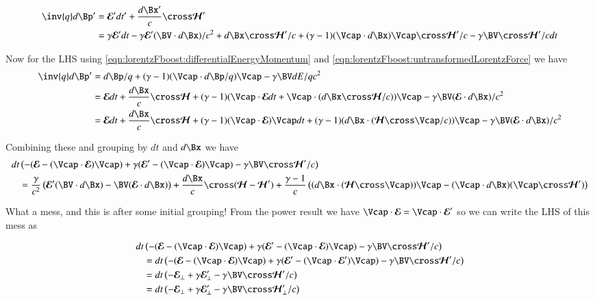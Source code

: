 \begin{align*}
\inv{q} d\Bp'
&= \EE' dt' + \frac{d\Bx'}{c} \cross \HH' \\
&= \gamma \EE' dt - \gamma \EE' (\BV \cdot d\Bx )/c^2 
+ d\Bx \cross \HH'/c + (\gamma-1)(\Vcap \cdot d\Bx) \Vcap \cross \HH'/c - \gamma \BV \cross \HH'/c dt \\
\end{align*}

Now for the LHS using \ref{eqn:lorentzFboost:differentialEnergyMomentum} and \ref{eqn:lorentzFboost:untransformedLorentzForce} we have
\begin{align*}
\inv{q} d\Bp'
&= d\Bp/q + (\gamma-1)(\Vcap \cdot d\Bp/q) \Vcap - \gamma \BV dE/qc^2 \\
&= \EE dt + \frac{d\Bx}{c} \cross \HH 
+ (\gamma-1)( \Vcap \cdot \EE dt + \Vcap \cdot (d\Bx \cross \HH/c) ) \Vcap - \gamma \BV (
\EE \cdot d\Bx
)/c^2 \\
&= \EE dt + \frac{d\Bx}{c} \cross \HH 
+ (\gamma-1) (\Vcap \cdot \EE) \Vcap dt
+ (\gamma-1)( d\Bx \cdot (\HH \cross \Vcap/c) ) \Vcap 
- \gamma \BV ( \EE \cdot d\Bx )/c^2 \\
\end{align*}

Combining these and grouping by $dt$ and $d\Bx$ we have
\begin{align*}
dt &\left(
-( \EE - (\Vcap \cdot \EE) \Vcap )
+ \gamma (\EE' - (\Vcap \cdot \EE) \Vcap )
- \gamma \BV \cross \HH'/c 
\right) \\
&= 
 \frac{\gamma}{c^2} \left( \EE' (\BV \cdot d\Bx ) - \BV ( \EE \cdot d\Bx ) \right)
+ \frac{d\Bx}{c} \cross (\HH -\HH') 
+ \frac{\gamma-1}{c}
\left(
( d\Bx \cdot (\HH \cross \Vcap) ) \Vcap - (\Vcap \cdot d\Bx) (\Vcap \cross \HH') 
\right) \\
\end{align*}

What a mess, and this is after some initial grouping!  From the power result we have $\Vcap \cdot \EE = \Vcap \cdot \EE'$ so we can write the LHS of this mess as

\begin{align*}
dt &\left(
-( \EE - (\Vcap \cdot \EE) \Vcap )
+ \gamma (\EE' - (\Vcap \cdot \EE) \Vcap )
- \gamma \BV \cross \HH'/c 
\right) \\
&=
dt \left(
-( \EE - (\Vcap \cdot \EE) \Vcap )
+ \gamma (\EE' - (\Vcap \cdot \EE') \Vcap )
- \gamma \BV \cross \HH'/c 
\right)
\\
&=
dt \left(
-\EE_\perp 
+ \gamma \EE_\perp' 
- \gamma \BV \cross \HH'/c 
\right)
\\
&=
dt \left(
-\EE_\perp 
+ \gamma \EE_\perp' 
- \gamma \BV \cross \HH_\perp'/c 
\right)
\\
\end{align*}

